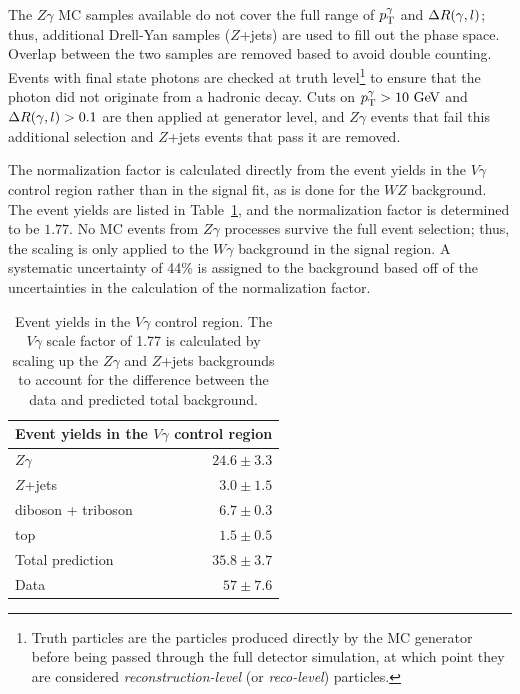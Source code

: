 The $Z\gamma$ MC samples available do not cover the full range of $p_{\mathrm{T}}^\gamma$ and $\Delta R(\gamma,l)$; thus, additional Drell-Yan samples ($Z$+jets) are used to fill out the phase space.
Overlap between the two samples are removed based to avoid double counting.
Events with final state photons are checked at truth level\footnote{Truth particles are the particles produced directly by the MC generator before being passed through the full detector simulation, at which point they are considered \emph{reconstruction-level} (or \emph{reco-level}) particles.} to ensure that the photon did not originate from a hadronic decay.
Cuts on $\pt^\gamma > 10\gev$ and $\Delta R(\gamma,l) > 0.1$ are then applied at generator level, and $Z\gamma$ events that fail this additional selection and $Z$+jets events that pass it are removed.

The normalization factor is calculated directly from the event yields in the $V\gamma$ control region rather than in the signal fit, as is done for the $WZ$ background.
The event yields are listed in Table~\ref{tab:ssww13tev_vgamma_numbers}, and the normalization factor is determined to be $1.77$.
No MC events from $Z\gamma$ processes survive the full event selection; thus, the scaling is only applied to the $W\gamma$ background in the signal region.
A systematic uncertainty of 44\% is assigned to the background based off of the uncertainties in the calculation of the normalization factor.

\begin{table}[htbp]
  \centering
  \begin{tabular}{l r}
    \multicolumn{2}{c}{Event yields in the $V\gamma$ control region} \\
    \hline\hline
    $Z\gamma$ & $24.6\pm 3.3$ \\
    $Z$+jets  &  $3.0\pm 1.5$ \\
    diboson + triboson & $6.7\pm 0.3$ \\
    top       &  $1.5\pm 0.5$ \\
    \hline
    Total prediction & $35.8\pm 3.7$ \\
    Data             & $57 \pm 7.6$ \\
    \hline
  \end{tabular}
  \caption{Event yields in the $V\gamma$ control region.  The $V\gamma$ scale factor of 1.77 is calculated by scaling up the $Z\gamma$ and $Z$+jets backgrounds to account for the difference between the data and predicted total background.}
  \label{tab:ssww13tev_vgamma_numbers}
\end{table}

